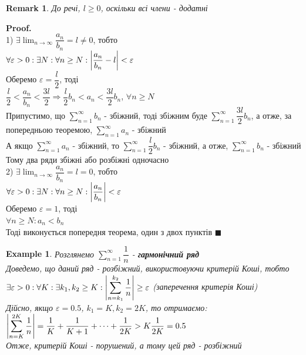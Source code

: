 \documentclass[a4paper, 14pt]{extarticle}
\def\huge{\displaystyle}
\def\bigline{\vspace{5mm}\\}
\theoremstyle{theoremdd}
\theoremstyle{theoremdd}
\theoremstyle{theoremdd}
\theoremstyle{theoremdd}
\newtheorem{example}[theorem]{Example}
\theoremstyle{theoremdd}
\theoremstyle{theoremdd}
\newtheorem{remark}[theorem]{Remark}
\theoremstyle{theoremdd}
\theoremstyle{theoremdd}
\newenvironment{pf}{\vspace*{-3mm} \textbf{Proof. \\}}{$\blacksquare$}
\begin{document}
\begin{remark}
До речі, $l \geq 0$, оскільки всі члени - додатні
\end{remark}

\begin{pf}
1) $\exists \huge \lim_{n \to \infty} \dfrac{a_n}{b_n} = l \neq 0$, тобто\\
$\forall \varepsilon > 0: \exists N: \forall n \geq N: \abs{\dfrac{a_n}{b_n}-l} < \varepsilon$\\
Оберемо $\varepsilon = \dfrac{l}{2}$, тоді\\
$\dfrac{l}{2} < \dfrac{a_n}{b_n} < \dfrac{3l}{2} \Rightarrow \dfrac{l}{2}b_n < a_n < \dfrac{3l}{2} b_n$, $\forall n \geq N$\\
Припустимо, що $\huge \sum_{n=1}^{\infty} b_n$ - збіжний, тоді збіжним буде $\huge \sum_{n=1}^{\infty} \dfrac{3l}{2} b_n$, а отже, за попередньою теоремою, $\huge \sum_{n=1}^{\infty} a_n$ - збіжний\\
А якщо $\huge \sum_{n=1}^{\infty} a_n$ - збіжний, то $\huge \sum_{n=1}^{\infty} \dfrac{l}{2}b_n$ - збіжний, а отже, $\huge \sum_{n=1}^{\infty} b_n$ - збіжний\\
Тому два ряди збіжні або розбіжні одночасно
\bigline
2) $\exists \huge \lim_{n \to \infty} \dfrac{a_n}{b_n} = l = 0$, тобто\\
$\forall \varepsilon > 0: \exists N: \forall n \geq N: \abs{\dfrac{a_n}{b_n}} < \varepsilon$\\
Оберемо $\varepsilon = 1$, тоді\\
$\forall n \geq N: a_n < b_n$\\
Тоді виконується попередня теорема, один з двох пунктів
\end{pf}

\begin{example}
Розглянемо $\huge \sum_{n=1}^{\infty} \dfrac{1}{n}$ - \textbf{гармонічний ряд}\\
Доведемо, що даний ряд - розбіжний, використовуючи критерій Коші, тобто\\
$\exists \varepsilon > 0: \forall K: \exists k_1,k_2 \geq K: \huge \abs{\sum_{n=k_1}^{k_2} \dfrac{1}{n}} \geq \varepsilon$ (заперечення критерія Коші)\\
Дійсно, якщо $\varepsilon = 0.5$, $k_1 = K, k_2 = 2K$, то отримаємо:\\
$\huge \abs{\sum_{n=K}^{2K} \dfrac{1}{n}} = \dfrac{1}{K} + \dfrac{1}{K+1} + \dots + \dfrac{1}{2K} > K \dfrac{1}{2K} = 0.5$\\
Отже, критерій Коші - порушений, а тому цей ряд - розбіжний
\end{example}
\end{document}
